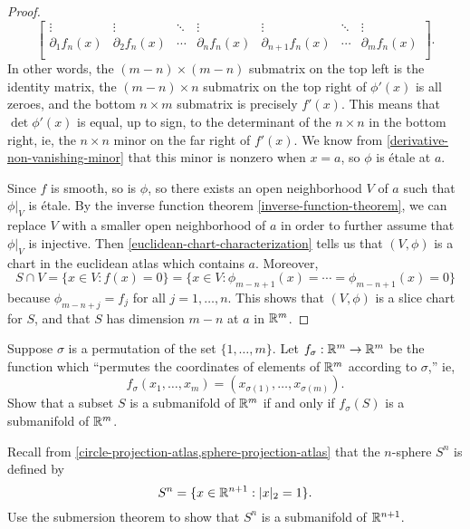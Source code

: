 \begin{proof}
\[\begin{bmatrix}
	\vdots & \vdots & \ddots & \vdots & \vdots & \ddots & \vdots \\
	\partial_1 f_{n}(x) & \partial_2 f_{n}(x) & \dotsb & \partial_n f_{n}(x) & \partial_{n+1} f_{n}(x)& \dotsb & \partial_m f_{n}(x) \\ 
	\end{bmatrix}. \]
	In other words, the $(m-n) \times (m-n)$ submatrix on the top left is the identity matrix, the $(m-n) \times n$ submatrix on the top right of $\phi'(x)$ is all zeroes, and the bottom $n \times m$ submatrix is precisely $f'(x)$. This means that $\det \phi'(x)$ is equal, up to sign, to the determinant of the $n \times n$ in the bottom right, ie, the $n \times n$ minor on the far right of $f'(x)$. We know from \cref{derivative-non-vanishing-minor} that this minor is nonzero when $x = a$, so $\phi$ is \'etale at $a$. 
	
	Since $f$ is smooth, so is $\phi$, so there exists an open neighborhood $V$ of $a$ such that $\phi|_V$ is \'etale. By the inverse function theorem \ref{inverse-function-theorem}, we can replace $V$ with a smaller open neighborhood of $a$ in order to further assume that $\phi|_V$ is injective. Then \cref{euclidean-chart-characterization} tells us that $(V, \phi)$ is a chart in the euclidean atlas which contains $a$. Moreover, 
	\[ S \cap V = \{ x \in V : f(x) = 0 \} = \{ x \in V : \phi_{m-n+1}(x) = \dotsb = \phi_{m-n+1}(x) = 0 \} \]
	because $\phi_{m-n+j} = f_j$ for all $j = 1, \dotsc, n$. This shows that $(V,\phi)$ is a slice chart for $S$, and that $S$ has dimension $m-n$ at $a$ in $\mathbb{R}^m$. 
\end{proof}

\begin{exercise} \label{permutation-submanifold}
	Suppose $\sigma$ is a permutation of the set $\{1, \dotsc, m\}$. Let $f_\sigma : \mathbb{R}^m \to \mathbb{R}^m$ be the function which ``permutes the coordinates of elements of $\mathbb{R}^m$ according to $\sigma$,'' ie, 
	\[ f_\sigma(x_1, \dotsc, x_m) = (x_{\sigma(1)}, \dotsc, x_{\sigma(m)}). \]
	Show that a subset $S$ is a submanifold of $\mathbb{R}^m$ if and only if $f_\sigma(S)$ is a submanifold of $\mathbb{R}^m$. 
\end{exercise}

\begin{exercise}
	Recall from \cref{circle-projection-atlas,sphere-projection-atlas} that the $n$-sphere $S^n$ is defined by
	\[ S^n = \{ x \in \mathbb{R}^{n+1} : |x|_2 = 1 \}. \]
	Use the submersion theorem to show that $S^n$ is a submanifold of $\mathbb{R}^{n+1}$. 
\end{exercise}

